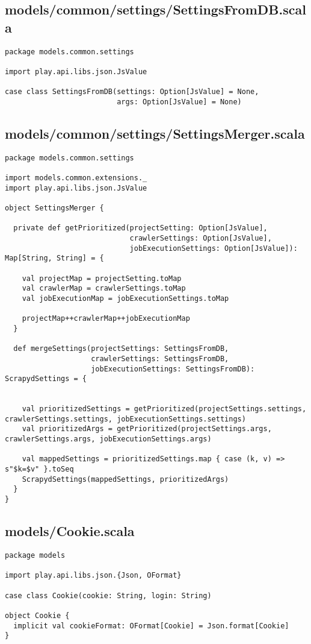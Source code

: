 \subsection{models/common/settings/SettingsFromDB.scala}
\begin{lstlisting}
package models.common.settings

import play.api.libs.json.JsValue

case class SettingsFromDB(settings: Option[JsValue] = None,
                          args: Option[JsValue] = None)\end{lstlisting}
\subsection{models/common/settings/SettingsMerger.scala}
\begin{lstlisting}
package models.common.settings

import models.common.extensions._
import play.api.libs.json.JsValue

object SettingsMerger {

  private def getPrioritized(projectSetting: Option[JsValue],
                             crawlerSettings: Option[JsValue],
                             jobExecutionSettings: Option[JsValue]): Map[String, String] = {

    val projectMap = projectSetting.toMap
    val crawlerMap = crawlerSettings.toMap
    val jobExecutionMap = jobExecutionSettings.toMap

    projectMap++crawlerMap++jobExecutionMap
  }

  def mergeSettings(projectSettings: SettingsFromDB,
                    crawlerSettings: SettingsFromDB,
                    jobExecutionSettings: SettingsFromDB): ScrapydSettings = {


    val prioritizedSettings = getPrioritized(projectSettings.settings, crawlerSettings.settings, jobExecutionSettings.settings)
    val prioritizedArgs = getPrioritized(projectSettings.args, crawlerSettings.args, jobExecutionSettings.args)

    val mappedSettings = prioritizedSettings.map { case (k, v) => s"$k=$v" }.toSeq
    ScrapydSettings(mappedSettings, prioritizedArgs)
  }
}
\end{lstlisting}
\subsection{models/Cookie.scala}
\begin{lstlisting}
package models

import play.api.libs.json.{Json, OFormat}

case class Cookie(cookie: String, login: String)

object Cookie {
  implicit val cookieFormat: OFormat[Cookie] = Json.format[Cookie]
}\end{lstlisting}
